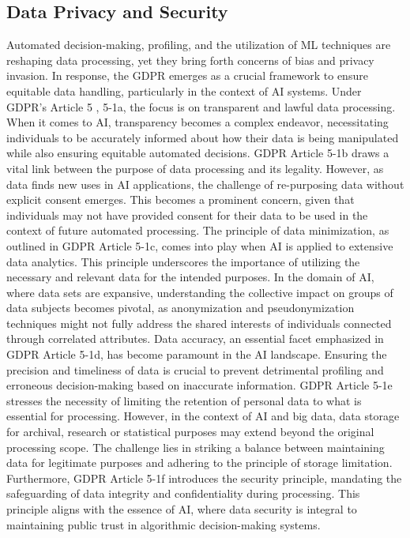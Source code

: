 \documentclass{article}
\begin{document}
\subsection{Data Privacy and Security}
Automated decision-making, profiling, and the utilization of ML techniques are reshaping data processing, yet they bring forth concerns of bias and privacy invasion. In response, the GDPR emerges as a crucial framework to ensure equitable data handling, particularly in the context of AI systems. Under GDPR's Article 5 \cite{clarke2019gdpr}, 5-1a, the focus is on transparent and lawful data processing. When it comes to AI, transparency becomes a complex endeavor, necessitating individuals to be accurately informed about how their data is being manipulated while also ensuring equitable automated decisions.
GDPR Article 5-1b draws a vital link between the purpose of data processing and its legality. However, as data finds new uses in AI applications, the challenge of re-purposing data without explicit consent emerges. This becomes a prominent concern, given that individuals may not have provided consent for their data to be used in the context of future automated processing.
The principle of data minimization, as outlined in GDPR Article 5-1c, comes into play when AI is applied to extensive data analytics. This principle underscores the importance of utilizing the necessary and relevant data for the intended purposes. In the domain of AI, where data sets are expansive, understanding the collective impact on groups of data subjects becomes pivotal, as anonymization and pseudonymization techniques might not fully address the shared interests of individuals connected through correlated attributes.
Data accuracy, an essential facet emphasized in GDPR Article 5-1d, has become paramount in the AI landscape. Ensuring the precision and timeliness of data is crucial to prevent detrimental profiling and erroneous decision-making based on inaccurate information.
GDPR Article 5-1e stresses the necessity of limiting the retention of personal data to what is essential for processing. However, in the context of AI and big data, data storage for archival, research or statistical purposes may extend beyond the original processing scope. The challenge lies in striking a balance between maintaining data for legitimate purposes and adhering to the principle of storage limitation.
Furthermore, GDPR Article 5-1f introduces the security principle, mandating the safeguarding of data integrity and confidentiality during processing. This principle aligns with the essence of AI, where data security is integral to maintaining public trust in algorithmic decision-making systems.
\end{document}
